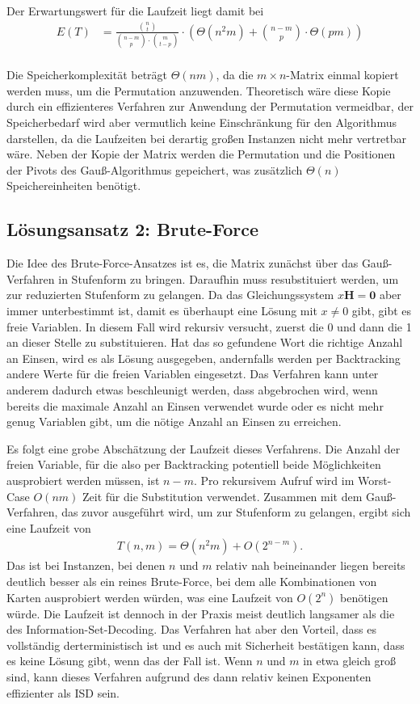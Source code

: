 \documentclass[a4paper,10pt,ngerman]{scrartcl}
\begin{document}
Der Erwartungswert für die Laufzeit liegt damit bei 
\begin{align*}
    E(T) &= \frac{\binom{n}{t}}{\binom{n-m}{p} \cdot \binom{m}{t-p}} \cdot \left(\Theta(n^2m) + \binom{n-m}{p}\cdot \Theta(pm)\right) \\
\end{align*}

Die Speicherkomplexität beträgt $\Theta(nm)$, da die $m \times n$-Matrix einmal kopiert werden muss, um die Permutation anzuwenden. Theoretisch wäre diese Kopie durch ein effizienteres Verfahren zur Anwendung der Permutation vermeidbar, der Speicherbedarf wird aber vermutlich keine Einschränkung für den Algorithmus darstellen, da die Laufzeiten bei derartig großen Instanzen nicht mehr vertretbar wäre. 
Neben der Kopie der Matrix werden die Permutation und die Positionen der Pivots des Gauß-Algorithmus gepeichert, was zusätzlich $\Theta(n)$ Speichereinheiten benötigt. 

\subsection{Lösungsansatz 2: Brute-Force}
Die Idee des Brute-Force-Ansatzes ist es, die Matrix zunächst über das Gauß-Verfahren in Stufenform zu bringen. Daraufhin muss resubstituiert werden, um zur reduzierten Stufenform zu gelangen. 
Da das Gleichungssystem $x\mathbf{H} = \mathbf{0}$ aber immer unterbestimmt ist, damit es überhaupt eine Lösung mit $x \neq 0$ gibt, gibt es freie Variablen.
In diesem Fall wird rekursiv versucht, zuerst die 0 und dann die 1 an dieser Stelle zu substituieren. 
Hat das so gefundene Wort die richtige Anzahl an Einsen, wird es als Lösung ausgegeben, andernfalls werden per Backtracking andere Werte für die freien Variablen eingesetzt. 
Das Verfahren kann unter anderem dadurch etwas beschleunigt werden, dass abgebrochen wird, wenn bereits die maximale Anzahl an Einsen verwendet wurde oder es nicht mehr genug Variablen gibt, um die nötige Anzahl an Einsen zu erreichen. 

Es folgt eine grobe Abschätzung der Laufzeit dieses Verfahrens.
Die Anzahl der freien Variable, für die also per Backtracking potentiell beide Möglichkeiten ausprobiert werden müssen, ist $n-m$. Pro rekursivem Aufruf wird im Worst-Case $O(nm)$ Zeit für die Substitution verwendet. Zusammen mit dem Gauß-Verfahren, das zuvor ausgeführt wird, um zur Stufenform zu gelangen, ergibt sich eine Laufzeit von 
\begin{align*}
    T(n,m) = \Theta(n^2m) + O(2^{n-m}).
\end{align*}
Das ist bei Instanzen, bei denen $n$ und $m$ relativ nah beineinander liegen bereits deutlich besser als ein reines Brute-Force, bei dem alle Kombinationen von Karten ausprobiert werden würden, was eine Laufzeit von $O(2^n)$ benötigen würde.
Die Laufzeit ist dennoch in der Praxis meist deutlich langsamer als die des Information-Set-Decoding.  
Das Verfahren hat aber den Vorteil, dass es vollständig derterministisch ist und es auch mit Sicherheit bestätigen kann, dass es keine Lösung gibt, wenn das der Fall ist. 
Wenn $n$ und $m$ in etwa gleich groß sind, kann dieses Verfahren aufgrund des dann relativ keinen Exponenten effizienter als ISD sein.
\end{document}
